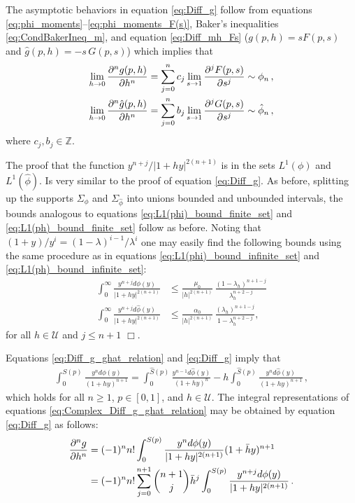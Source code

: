 \documentclass[english,12pt]{ttuthes}
\newcommand{\ph}{\hat{\phi}}
\begin{document}
The asymptotic behaviors in equation \eqref{eq:Diff_g} follow from
equations \eqref{eq:phi_moments}--\eqref{eq:phi_moments_F(s)}, Baker's
inequalities \eqref{eq:CondBakerIneq_m}, and equation
\eqref{eq:Diff_mh_Fs} ($g(p,h)=sF(p,s)$ and $\hat{g}(p,h)=-s\,G(p,s)$)
which implies that 
%
\begin{align}\label{eq:Diff_mh_Fs}
  \lim_{h\to0}\frac{\partial^ng(p,h)}{\partial h^n}
         =\sum_{j=0}^nc_j\lim_{s\to1}\frac{\partial^jF(p,s)}{\partial s^j}\sim\phi_n\,,\\
  \lim_{h\to0}\frac{\partial^n\hat{g}(p,h)}{\partial h^n}
         =\sum_{j=0}^nb_j\lim_{s\to1}\frac{\partial^jG(p,s)}{\partial s^j}\sim\ph_n\,,  \notag     
\end{align}
where $c_j,b_j\in\mathbb{Z}$.

The proof that the function $y^{n+j}/|1+hy|^{2(n+1)}$ is in the sets
$L^1(\phi)$ and $L^1(\ph)$. Is very similar to the proof of equation
\eqref{eq:Diff_g}. As before, splitting up the supports $\Sigma_\phi$ and
$\Sigma_{\ph}$ into unions bounded and unbounded intervals, the bounds
analogous to equations \eqref{eq:L1(phi)_bound_finite_set} and
\eqref{eq:L1(ph)_bound_finite_set} follow as before. Noting that
$(1+y)/y^i=(1-\lambda)^{i-1}/\lambda^i$ one may easily find the following bounds
using the same procedure as in equations
\eqref{eq:L1(phi)_bound_infinite_set} and
\eqref{eq:L1(ph)_bound_infinite_set}:
%
\begin{align}
  \int_0^\infty\frac{y^{n+j}d\phi(y)}{|1+hy|^{2(n+1)}}
     &\leq\frac{\mu_0}{|h|^{2(n+1)}}\,\frac{(1-\lambda_h)^{n+1-j}}{\lambda_h^{n+2-j}}\\
  \int_0^\infty\frac{y^{n+j}d\ph(y)}{|1+hy|^{2(n+1)}}
     &\leq\frac{\alpha_0}{|h|^{2(n+1)}}\,\frac{(\lambda_h)^{n+1-j}}{1-\lambda_h^{n+2-j}},  
\end{align}
%
for all $h\in\mathcal{U}$ and $j\leq n+1$ $\Box$.

Equations \eqref{eq:Diff_g_ghat_relation} and \eqref{eq:Diff_g} imply
that   
%
\begin{align}\label{eq:Diff_g_ghat_relation_Integral}
  \int_0^{S(p)}\frac{y^nd\phi(y)}{(1+hy)^{n+1}}=\int_0^{\hat{S}(p)}\frac{y^{n-1}d\ph(y)}{(1+hy)^n} 
                                -h \int_0^{\hat{S}(p)}\frac{y^nd\ph(y)}{(1+hy)^{n+1}}
  \,,                              
\end{align}
%
which holds for all $n\geq1$, $p\in[0,1]$, and $h\in\mathcal{U}$. The
integral representations of equations
\eqref{eq:Complex_Diff_g_ghat_relation} may be obtained by equation
\eqref{eq:Diff_g} as follows:  
%
\begin{align}\label{eq:Complex_Diff_g}
  \frac{\partial^ng}{\partial h^n}
   &=(-1)^nn!\int_0^{S(p)}\frac{y^nd\phi(y)}{|1+hy|^{2(n+1)}}(1+\bar{h}y)^{n+1}\\
   &=(-1)^nn!\sum_{j=0}^{n+1}{n+1 \choose j}\bar{h}^j
                 \int_0^{S(p)}\frac{y^{n+j}d\phi(y)}{|1+hy|^{2(n+1)}}\,.
 \notag
\end{align}
%
\end{document}
